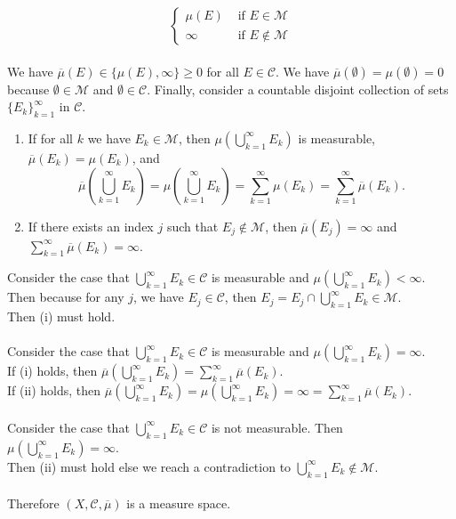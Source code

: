 \begin{enumerate}
\begin{enumerate}[label=(\roman*),align=left]
\[			\begin{cases}
				\mu(E)&\text{ if }E\in\mathcal{M}\\
				\infty&\text{ if }E\notin\mathcal{M}
			\end{cases}	
		\]
		\\We have $\overline\mu(E)\in\{\mu(E),\infty\}\ge0$ for all $E\in\mathcal{C}$.
		We have $\overline\mu(\emptyset)=\mu(\emptyset)=0$ because $\emptyset\in\mathcal{M}$ and $\emptyset\in\mathcal{C}$.
		Finally, consider a countable disjoint collection of sets $\{E_k\}_{k=1}^\infty$ in $\mathcal{C}$.
		\begin{enumerate}[label=(\roman*),align=left]  
			\item If for all $k$ we have $E_k\in\mathcal{M}$, then $\mu(\bigcup_{k=1}^\infty E_k)$ is measurable, $\overline\mu(E_k)=\mu(E_k)$, and
			\[
				\overline\mu(\bigcup_{k=1}^\infty E_k)=\mu(\bigcup_{k=1}^\infty E_k)=\sum_{k=1}^\infty \mu(E_k)=\sum_{k=1}^\infty \overline\mu(E_k).
			\]
			\item If there exists an index $j$ such that $E_j\notin\mathcal{M}$, then $\overline\mu(E_j)=\infty$ and $\sum_{k=1}^\infty \overline\mu(E_k)=\infty$.
		\end{enumerate}
		Consider the case that $\bigcup_{k=1}^\infty E_k\in\mathcal{C}$ is measurable and $\mu(\bigcup_{k=1}^\infty E_k)<\infty$. 
		\\Then because for any $j$, we have $E_j\in\mathcal{C}$, then $E_j=E_j\cap\bigcup_{k=1}^\infty E_k\in\mathcal{M}$.\\
		Then (i) must hold.\\
		\\Consider the case that $\bigcup_{k=1}^\infty E_k\in\mathcal{C}$ is measurable and $\mu(\bigcup_{k=1}^\infty E_k)=\infty$. \\
		If (i) holds, then $\overline\mu(\bigcup_{k=1}^\infty E_k)=\sum_{k=1}^\infty\overline\mu(E_k)$.\\
		If (ii) holds, then $\overline\mu(\bigcup_{k=1}^\infty E_k)=\mu(\bigcup_{k=1}^\infty E_k)=\infty=\sum_{k=1}^\infty \overline\mu(E_k)$.\\
		\\Consider the case that $\bigcup_{k=1}^\infty E_k\in\mathcal{C}$ is not measurable. Then $\mu(\bigcup_{k=1}^\infty E_k)=\infty$. \\
		Then (ii) must hold else we reach a contradiction to $\bigcup_{k=1}^\infty E_k\notin\mathcal{M}$.\\
		\\Therefore $(X,\mathcal{C},\overline\mu)$ is a measure space.\\

\end{enumerate}
\end{enumerate}
